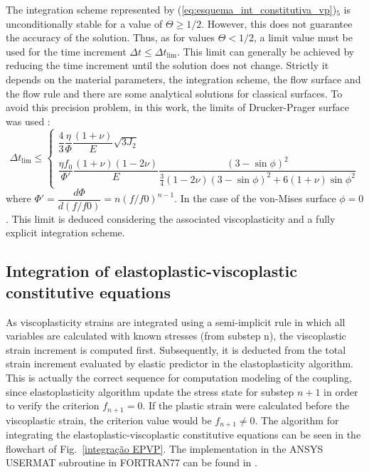 \documentclass[Journal,letterpaper]{ascelike-new}
\begin{document}
The integration scheme represented by (\ref{eq:esquema_int_constitutiva_vp})$_5$ is unconditionally stable for a value of $\Theta \geq 1/2$. However, this does not guarantee the accuracy of the solution. Thus, as for values $\Theta < 1/2$, a limit value must be used for the time increment $\Delta t \leq \Delta t_{\text{lim}}$. This limit can generally be achieved by reducing the time increment until the solution does not change. Strictly it depends on the material parameters, the integration scheme, the flow surface and the flow rule and there are some analytical solutions for classical surfaces. To avoid this precision problem, in this work, the limits of Drucker-Prager surface was used \cite{cormeau1975}:
\begin{equation}
	\label{eq:deltatmin_dp}
	\Delta t_{\text{lim}} \leq \left\{ 
	\begin{array}{lcl} 
		\dfrac{4}{3}\dfrac{\eta}{\Phi}\dfrac{(1+\nu)}{E} {\sqrt{3J_2}} \\
		\dfrac{\eta f_0}{\Phi'}\dfrac{(1+\nu)(1-2\nu)}{E}\dfrac{(3-\sin{\phi})^2}{\frac{3}{4}(1-2\nu)(3-\sin{\phi})^2 + 6(1+\nu)\sin{\phi}^2}
	\end{array} \right.
\end{equation}
where $\Phi'= \dfrac{d \Phi}{d(f/f0)} = n(f/f0)^{n-1}$. In the case of the von-Mises surface $\phi = 0$. This limit is deduced considering the associated viscoplasticity and a fully explicit integration scheme. 

\subsection{Integration of elastoplastic-viscoplastic constitutive equations}

As viscoplasticity strains are integrated using a semi-implicit rule in which all variables are calculated with known stresses (from substep n), the viscoplastic strain increment is computed first. Subsequently, it is deducted from the total strain increment evaluated by elastic predictor in the elastoplasticity algorithm. This is actually the correct sequence for computation modeling of the coupling, since elastoplasticity algorithm update the stress state for substep $n+1$ in order to verify the criterion $f_{n+1}=0$. If the plastic strain were calculated before the viscoplastic strain, the criterion value would be $f_{n+1} \ne 0$. The algorithm for integrating the elastoplastic-viscoplastic constitutive equations can be seen in the flowchart of Fig.~\ref{integração EPVP}. The implementation in the ANSYS USERMAT subroutine in FORTRAN77 can be found in .
\end{document}
